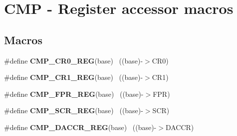 \hypertarget{group___c_m_p___register___accessor___macros}{}\section{C\+M\+P -\/ Register accessor macros}
\label{group___c_m_p___register___accessor___macros}
\subsection*{Macros}
\begin{DoxyCompactItemize}
\item 
\hypertarget{group___c_m_p___register___accessor___macros_gade821ad13c2c460c33f1c0929cc904c3}{}\#define {\bfseries C\+M\+P\+\_\+\+C\+R0\+\_\+\+R\+E\+G}(base)                                            ~((base)-\/$>$C\+R0)\label{group___c_m_p___register___accessor___macros_gade821ad13c2c460c33f1c0929cc904c3}

\item 
\hypertarget{group___c_m_p___register___accessor___macros_ga2f761d7412507e4415f230a5e4d972a2}{}\#define {\bfseries C\+M\+P\+\_\+\+C\+R1\+\_\+\+R\+E\+G}(base)                                            ~((base)-\/$>$C\+R1)\label{group___c_m_p___register___accessor___macros_ga2f761d7412507e4415f230a5e4d972a2}

\item 
\hypertarget{group___c_m_p___register___accessor___macros_ga343773a1ef97ce5124a805a7e42af104}{}\#define {\bfseries C\+M\+P\+\_\+\+F\+P\+R\+\_\+\+R\+E\+G}(base)                                            ~((base)-\/$>$F\+P\+R)\label{group___c_m_p___register___accessor___macros_ga343773a1ef97ce5124a805a7e42af104}

\item 
\hypertarget{group___c_m_p___register___accessor___macros_ga078b884bead12ed9b24c285c8f73fd27}{}\#define {\bfseries C\+M\+P\+\_\+\+S\+C\+R\+\_\+\+R\+E\+G}(base)                                            ~((base)-\/$>$S\+C\+R)\label{group___c_m_p___register___accessor___macros_ga078b884bead12ed9b24c285c8f73fd27}

\item 
\hypertarget{group___c_m_p___register___accessor___macros_ga241a18e5c046627c53ba30229a1a313c}{}\#define {\bfseries C\+M\+P\+\_\+\+D\+A\+C\+C\+R\+\_\+\+R\+E\+G}(base)                                        ~((base)-\/$>$D\+A\+C\+C\+R)\label{group___c_m_p___register___accessor___macros_ga241a18e5c046627c53ba30229a1a313c}


\end{DoxyCompactItemize}
